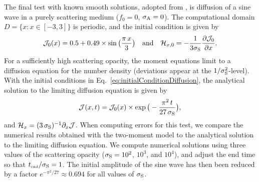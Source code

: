 The final test with known smooth solutions, adopted from \cite{radice_etal_2013}, is diffusion of a sine wave in a purely scattering medium ($f_{0}=0$, $\sigma_{{\rm A}}=0$).  
The computational domain $D=\{x:x\in[-3,3]\}$ is periodic, and the initial condition is given by
\begin{equation}
  \mathcal{J}_{0}(x)=0.5+0.49\times\sin\big(\frac{\pi\,x}{3}\big)
  \quad\text{and}\quad
  \mathcal{H}_{x,0}
  =-\frac{1}{3\sigma_{{\rm S}}}\frac{\partial \mathcal{J}_{0}}{\partial x}.  
  \label{eq:initialConditionDiffusion}
\end{equation}
For a sufficiently high scattering opacity, the moment equations limit to a diffusion equation for the number density (deviations appear at the $1/\sigma_{{\rm S}}^{2}$-level).  
With the initial conditions in Eq.~\eqref{eq:initialConditionDiffusion}, the analytical solution to the limiting diffusion equation is given by
\begin{equation}
  \mathcal{J}(x,t)=\mathcal{J}_{0}(x)\times\exp\big(-\frac{\pi^{2}\,t}{27\,\sigma_{{\rm S}}}\big),
\end{equation}
and $\mathcal{H}_{x}=(3\,\sigma_{{\rm S}})^{-1}\partial_{x}{\mathcal{J}}$.  
When computing errors for this test, we compare the numerical results obtained with the two-moment model to the analytical solution to the limiting diffusion equation.  
We compute numerical solutions using three values of the scattering opacity ($\sigma_{{\rm S}}=10^{2}$, $10^{3}$, and $10^{4}$), and adjust the end time so that $t_{\mbox{\tiny end}}/\sigma_{{\rm S}}=1$.  
The initial amplitude of the sine wave has then been reduced by a factor $e^{-\pi^{2}/27}\approx0.694$ for all values of $\sigma_{{\rm S}}$.  

